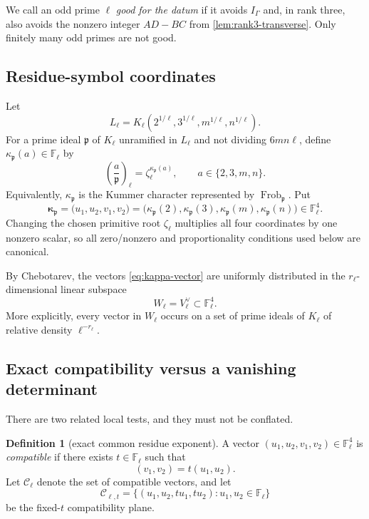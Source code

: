 \documentclass[11pt,oneside]{article}
\theoremstyle{definition}
\newtheorem{definition}[theorem]{Definition}
\theoremstyle{remark}
\newcommand{\F}{\mathbb{F}}
\newcommand{\Frob}{\operatorname{Frob}}
\begin{document}
We call an odd prime $\ell$ \emph{good for the datum} if it avoids
$I_\Gamma$ and, in rank three, also avoids the nonzero integer $AD-BC$ from
\cref{lem:rank3-transverse}.  Only finitely many odd primes are not good.

\subsection{Residue-symbol coordinates}

Let
\[
 L_\ell=K_\ell(2^{1/\ell},3^{1/\ell},m^{1/\ell},n^{1/\ell}).
\]
For a prime ideal $\mathfrak p$ of $K_\ell$ unramified in $L_\ell$ and not
dividing $6mn\ell$, define $\kappa_{\mathfrak p}(a)\in\F_\ell$ by
\[
 \left(\frac{a}{\mathfrak p}\right)_\ell
   =\zeta_\ell^{\kappa_{\mathfrak p}(a)},
 \qquad a\in\{2,3,m,n\}.
\]
Equivalently, $\kappa_{\mathfrak p}$ is the Kummer character represented by
$\Frob_{\mathfrak p}$.  Put
\begin{equation}\label{eq:kappa-vector}
 \boldsymbol\kappa_{\mathfrak p}
 =\bigl(u_1,u_2,v_1,v_2\bigr)
 =\bigl(\kappa_{\mathfrak p}(2),\kappa_{\mathfrak p}(3),
        \kappa_{\mathfrak p}(m),\kappa_{\mathfrak p}(n)\bigr)
 \in\F_\ell^4.
\end{equation}
Changing the chosen primitive root $\zeta_\ell$ multiplies all four
coordinates by one nonzero scalar, so all zero/nonzero and proportionality
conditions used below are canonical.

By Chebotarev, the vectors \eqref{eq:kappa-vector} are uniformly distributed
in the $r_\ell$-dimensional linear subspace
\[
 W_\ell=V_\ell^\vee\subset\F_\ell^4.
\]
More explicitly, every vector in $W_\ell$ occurs on a set of prime ideals of
$K_\ell$ of relative density $\ell^{-r_\ell}$.

\subsection{Exact compatibility versus a vanishing determinant}

There are two related local tests, and they must not be conflated.

\begin{definition}[exact common residue exponent]\label{def:exact-compatible}
A vector $(u_1,u_2,v_1,v_2)\in\F_\ell^4$ is \emph{compatible} if there exists
$t\in\F_\ell$ such that
\[
 (v_1,v_2)=t(u_1,u_2).
\]
Let $\mathcal C_\ell$ denote the set of compatible vectors, and let
\[
 \mathcal C_{\ell,t}=\{(u_1,u_2,tu_1,tu_2):u_1,u_2\in\F_\ell\}
\]
be the fixed-$t$ compatibility plane.
\end{definition}
\end{document}

